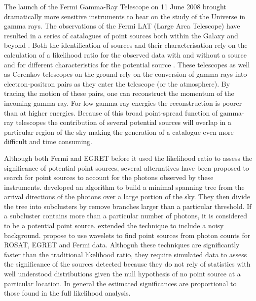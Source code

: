 \documentclass[useAMS,usenatbib]{mn2e}
\begin{document}
The launch of the Fermi Gamma-Ray Telescope on 11 June 2008 brought
dramatically more sensitive instruments to bear on the study of the
Universe in gamma rays.  The observations of the Fermi LAT (Large Area
Telescope) \citep[e.g.][]{2012ApJS..203....4A} have resulted in a
series of catalogues of point sources both within the Galaxy and
beyond \citep[e.g.][]{2010ApJS..188..405A,2011ApJ...743..171A,
  2012ApJS..199...31N,2013ApJS..208...17A,
  2013ApJS..209...34A,2015ApJS..218...23A}.  Both the identification
of sources and their characterisation rely on the calculation of a
likelihood ratio for the observed data with and without a source and
for different characteristics for the potential source
\citep{1979ApJ...228..939C,1992MNRAS.259..413S,1996ApJ...461..396M}.
These telescopes as well as Cerenkov telescopes on the ground rely on
the conversion of gamma-rays into electron-positron pairs as they
enter the telescope (or the atmosphere).  By tracing the motion of
these pairs, one can reconstruct the momentum of the incoming gamma
ray.  For low gamma-ray energies the reconstruction is poorer than at
higher energies.  Because of this broad point-spread function of
gamma-ray telescopes the contribution of several potential sources
will overlap in a particular region of the sky making the generation
of a catalogue even more difficult and time consuming.

Although both Fermi and EGRET before it used the likelihood ratio to
assess the significance of potential point sources, several
alternatives have been proposed to search for point sources to account
for the photons observed by these instruments.
\citet{2009arXiv0912.3843M,2008MNRAS.383.1166C} developed an algorithm
to build a minimal spanning tree from the arrival directions of the
photons over a large portion of the sky.  They then divide the tree
into subclusters by remove branches larger than a particular
threshold.  If a subcluster contains more than a particular number of
photons, it is considered to be a potential point source.
\citet{2013Ap&SS.347..169C} extended the technique to include a noisy
background.
\citet{1997ApJ...483..350D,1997ApJ...483..370D,2007AIPC..921..546C}
propose to use wavelets to find point sources from photon counts for
ROSAT, EGRET and Fermi data.  Althoguh these techniques are
significantly faster than the traditional likelihood ratio, they
require simulated data to assess the significance of the sources
detected because they do not rely of statistics with well understood
distributions given the null hypothesis of no point source at a
particular location.  In general the estimated significances are
proportional to those found in the full likelihood analysis.
\end{document}
